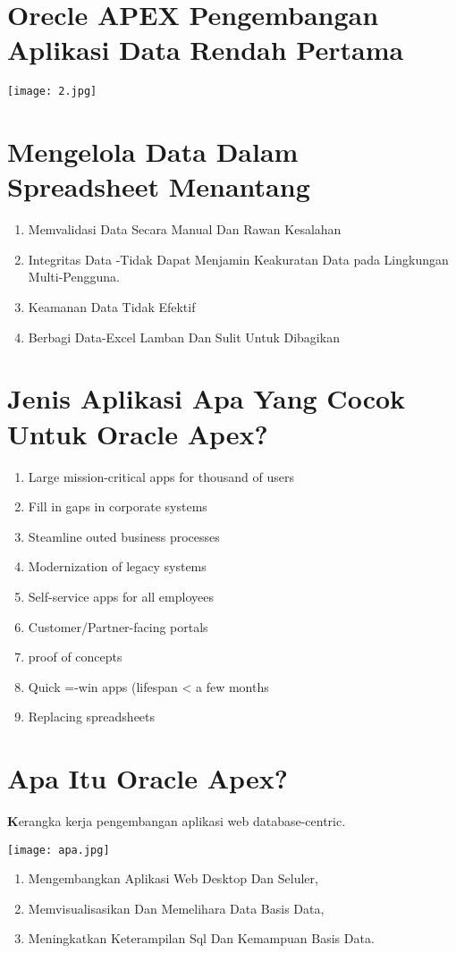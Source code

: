 \documentclass[a4paper,12pt]{report}
\begin{document}
\section{Orecle APEX Pengembangan Aplikasi Data Rendah Pertama}
\begin{center}
    \texttt{[image: 2.jpg]}
\end{center}

\section{Mengelola Data Dalam Spreadsheet Menantang}
\begin{enumerate}
    \item Memvalidasi Data Secara Manual Dan Rawan Kesalahan
    \item Integritas Data -Tidak Dapat Menjamin Keakuratan Data pada Lingkungan Multi-Pengguna.
    \item Keamanan Data Tidak Efektif
    \item Berbagi Data-Excel Lamban Dan Sulit Untuk Dibagikan
\end{enumerate}

\section{
Jenis Aplikasi Apa Yang Cocok Untuk Oracle Apex?}
\begin{enumerate}
    \item Large mission-critical apps for thousand of users
    \item Fill in gaps in corporate systems
    \item Steamline outed business processes
    \item Modernization of legacy systems
    \item Self-service apps for all employees
    \item Customer/Partner-facing portals
    \item proof of concepts
    \item Quick =-win apps (lifespan < a few months
    \item Replacing spreadsheets
\end{enumerate}

\section{Apa Itu Oracle Apex?}
\textbf Kerangka kerja pengembangan aplikasi web database-centric.
\begin{center}
    \texttt{[image: apa.jpg]}
\end{center}
\begin{enumerate}
    \item Mengembangkan Aplikasi Web Desktop Dan Seluler, 
    \item Memvisualisasikan Dan Memelihara Data Basis Data, 
    \item Meningkatkan Keterampilan Sql Dan Kemampuan Basis Data.
\end{enumerate}
\end{document}
